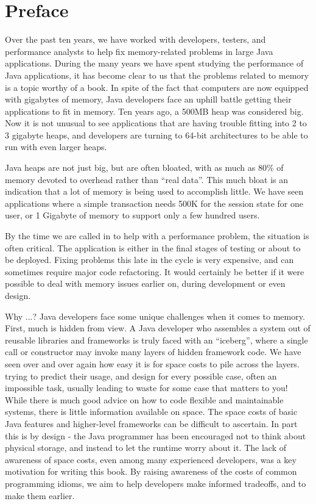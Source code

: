 \chapter*{Preface}

Over the past ten years, we have worked with developers, testers, and
performance analysts to help fix memory-related problems in large Java
applications.  During the many years we have spent studying the performance of
Java applications, it has become clear to us that the problems related to memory
is a topic worthy of a book. In spite of the fact that computers are now
equipped with gigabytes of memory, Java developers face an uphill battle getting
their applications to fit in memory. Ten years ago, a 500MB heap was considered
big. Now it is not unusual to see applications that are having trouble fitting
into 2 to 3 gigabyte heaps, and developers are turning to 64-bit architectures
to be able to run with even larger heaps.

Java heaps are not just big, but are often bloated, with as much as 80\% of
memory devoted to overhead rather than "`real data"'. This much bloat is an
indication that a lot of memory is being used to accomplish little. We have seen
applications where a simple transaction needs 500K for the session state for one
user, or 1 Gigabyte of memory to support only a few hundred users.

By the time we are called in to help with a performance problem, the situation
is often critical. The application is either in the final stages of testing or
about to be deployed. Fixing problems this late in the cycle is very expensive,
and can sometimes require major code refactoring. It would certainly be better
if it were possible to deal with memory issues earlier on, during development or
even design.

Why ...? Java developers face some unique challenges when it comes to memory.
First, much is hidden from view. A Java developer who assembles a system out of
reusable libraries and frameworks is truly faced with an "`iceberg"', where a
single call or constructor may invoke many layers of hidden framework code. We
have seen over and over again how easy it is for space costs to pile across the
layers. %
trying to predict their usage, and design for every possible case, often an
impossible task, usually leading to waste for some case that matters to you!
While there is much good advice on how to code flexible and maintainable
systems, there is little information available on space. The space costs of
basic Java features and higher-level frameworks can be difficult to ascertain.
In part this is by design - the Java programmer has been encouraged not to think
about physical storage, and instead to let the runtime worry about it. The lack
of awareness of space costs, even among many experienced developers, was a key
motivation for writing this book. By raising awareness of the costs of common
programming idioms, we aim to help developers make informed tradeoffs, and to
make them earlier.

